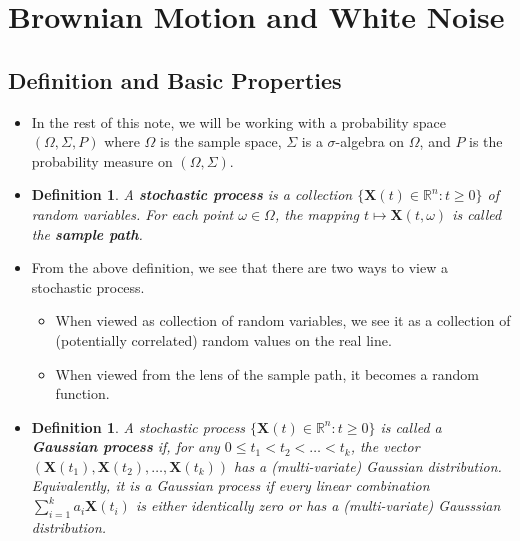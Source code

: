 \documentclass[10pt]{article}
\newtheorem{definition}[lemma]{Definition}
\newcommand{\ve}[1]{\mathbf{#1}}
\newcommand{\Real}{\mathbb{R}}
\begin{document}
\section{Brownian Motion and White Noise}

\subsection{Definition and Basic Properties}

\begin{itemize}
  \item In the rest of this note, we will be working with a probability space $(\Omega, \Sigma, P)$ where $\Omega$ is the sample space, $\Sigma$ is a $\sigma$-algebra on $\Omega$, and $P$ is the probability measure on $(\Omega,\Sigma)$.

  \item \begin{definition}
    A {\bf stochastic process} is a collection $\{\ve{X}(t) \in \Real^n : t \geq 0\}$ of random variables. For each point $\omega \in \Omega$, the mapping $t \mapsto \ve{X}(t,\omega)$ is called the {\bf sample path}.
  \end{definition}  

  \item From the above definition, we see that there are two ways to view a stochastic process.
  \begin{itemize}
    \item When viewed as collection of random variables, we see it as a collection of (potentially correlated) random values on the real line.
    \item When viewed from the lens of the sample path, it becomes a random function.
  \end{itemize}

  \item \begin{definition}
    A stochastic process $\{ \ve{X}(t) \in \Real^n: t \geq 0 \}$ is called a {\bf Gaussian process} if, for any $0 \leq t_1 < t_2 < \dotsc < t_k$, the vector $(\ve{X}(t_1), \ve{X}(t_2), \dotsc, \ve{X}(t_k))$ has a (multi-variate) Gaussian distribution. Equivalently, it is a Gaussian process if every linear combination $\sum_{i=1}^k a_i \ve{X}(t_i)$ is either identically zero or has a (multi-variate) Gausssian distribution.
  \end{definition}


\end{itemize}
\end{document}
